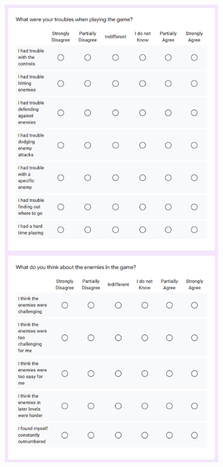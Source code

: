 \begin{figure}[!ht]
    \begin{center}
        \includegraphics[width=26em]{figures/fig-player-perception-survey-pt2.png}
    \end{center}
\end{figure}

